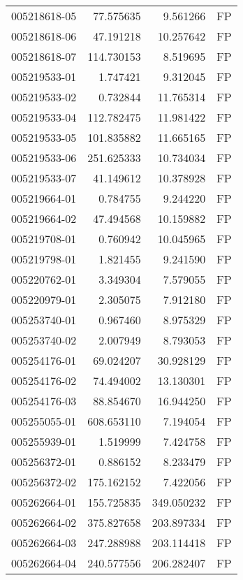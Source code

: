 \begin{tabular}{lrrl}
005218618-05 &   77.575635 &       9.561266 &   FP \\
005218618-06 &   47.191218 &      10.257642 &   FP \\
005218618-07 &  114.730153 &       8.519695 &   FP \\
005219533-01 &    1.747421 &       9.312045 &   FP \\
005219533-02 &    0.732844 &      11.765314 &   FP \\
005219533-04 &  112.782475 &      11.981422 &   FP \\
005219533-05 &  101.835882 &      11.665165 &   FP \\
005219533-06 &  251.625333 &      10.734034 &   FP \\
005219533-07 &   41.149612 &      10.378928 &   FP \\
005219664-01 &    0.784755 &       9.244220 &   FP \\
005219664-02 &   47.494568 &      10.159882 &   FP \\
005219708-01 &    0.760942 &      10.045965 &   FP \\
005219798-01 &    1.821455 &       9.241590 &   FP \\
005220762-01 &    3.349304 &       7.579055 &   FP \\
005220979-01 &    2.305075 &       7.912180 &   FP \\
005253740-01 &    0.967460 &       8.975329 &   FP \\
005253740-02 &    2.007949 &       8.793053 &   FP \\
005254176-01 &   69.024207 &      30.928129 &   FP \\
005254176-02 &   74.494002 &      13.130301 &   FP \\
005254176-03 &   88.854670 &      16.944250 &   FP \\
005255055-01 &  608.653110 &       7.194054 &   FP \\
005255939-01 &    1.519999 &       7.424758 &   FP \\
005256372-01 &    0.886152 &       8.233479 &   FP \\
005256372-02 &  175.162152 &       7.422056 &   FP \\
005262664-01 &  155.725835 &     349.050232 &   FP \\
005262664-02 &  375.827658 &     203.897334 &   FP \\
005262664-03 &  247.288988 &     203.114418 &   FP \\
005262664-04 &  240.577556 &     206.282407 &   FP \\

\end{tabular}
